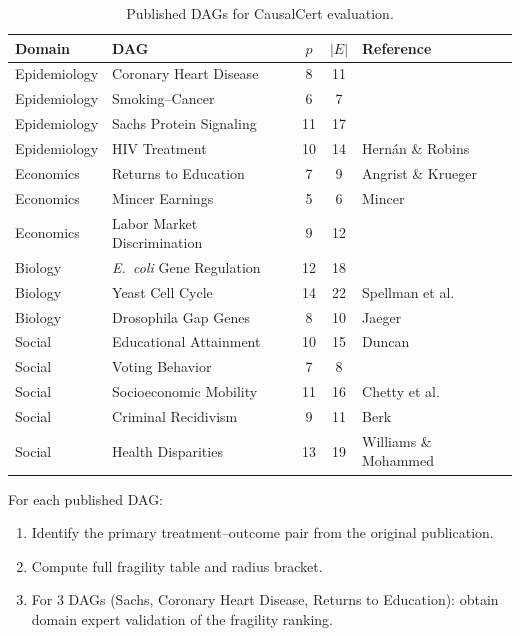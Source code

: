 \documentclass[11pt,a4paper]{article}
\theoremstyle{definition}
\theoremstyle{remark}
\begin{document}
\begin{table}[h]
\centering
\caption{Published DAGs for CausalCert evaluation.}
\label{tab:published_dags}
\begin{tabular}{@{}llccl@{}}
\toprule
\textbf{Domain} & \textbf{DAG} & $p$ & $|E|$ & \textbf{Reference} \\
\midrule
Epidemiology & Coronary Heart Disease & 8 & 11 & \cite{lauritzen1988} \\
Epidemiology & Smoking--Cancer & 6 & 7 & \cite{pearl2009} \\
Epidemiology & Sachs Protein Signaling & 11 & 17 & \cite{sachs2005} \\
Epidemiology & HIV Treatment & 10 & 14 & Hernán \& Robins \\
Economics & Returns to Education & 7 & 9 & Angrist \& Krueger \\
Economics & Mincer Earnings & 5 & 6 & Mincer \\
Economics & Labor Market Discrimination & 9 & 12 & \cite{neal1996} \\
Biology & \textit{E.\ coli} Gene Regulation & 12 & 18 & \cite{shen2002} \\
Biology & Yeast Cell Cycle & 14 & 22 & Spellman et al.\ \\
Biology & Drosophila Gap Genes & 8 & 10 & Jaeger \\
Social & Educational Attainment & 10 & 15 & Duncan \\
Social & Voting Behavior & 7 & 8 & \cite{morgan2015} \\
Social & Socioeconomic Mobility & 11 & 16 & Chetty et al.\ \\
Social & Criminal Recidivism & 9 & 11 & Berk \\
Social & Health Disparities & 13 & 19 & Williams \& Mohammed \\
\bottomrule
\end{tabular}
\end{table}

\noindent For each published DAG:
\begin{enumerate}
  \item Identify the primary treatment--outcome pair from the original publication.
  \item Compute full fragility table and radius bracket.
  \item For 3 DAGs (Sachs, Coronary Heart Disease, Returns to Education): obtain
    domain expert validation of the fragility ranking.
\end{enumerate}
\end{document}
